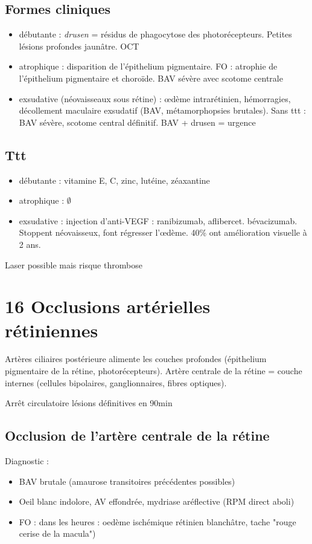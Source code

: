 \documentclass[11pt]{article}
\begin{document}
\subsection{Formes cliniques}
\label{sec:org13e641e}
\begin{itemize}
\item débutante : \emph{drusen} = résidus de phagocytose des photorécepteurs. Petites
lésions profondes jaunâtre. OCT
\item atrophique : disparition de l'épithelium pigmentaire. FO : atrophie de
l'épithelium pigmentaire et choroïde. BAV sévère avec scotome centrale
\item exsudative (néovaisseaux sous rétine) : \oe{}dème intrarétinien, hémorragies,
décollement maculaire exsudatif (BAV, métamorphopsies brutales). Sans ttt :
BAV sévère, scotome central définitif. BAV + drusen = urgence \skull
\end{itemize}

\subsection{Ttt}
\label{sec:org400e907}
\begin{itemize}
\item débutante : vitamine E, C, zinc, lutéine, zéaxantine
\item atrophique : \(\emptyset\)
\item exsudative : injection d'anti-VEGF : ranibizumab,
aflibercet. bévacizumab. Stoppent néovaisseux, font régresser l'\oe{}dème. 40\%
ont amélioration visuelle à 2 ans.
\end{itemize}
Laser possible mais risque thrombose
\section{16 Occlusions artérielles rétiniennes}
\label{sec:orgb973ac1}
Artères ciliaires postérieure alimente les couches profondes (épithelium
pigmentaire de la rétine, photorécepteurs). 
Artère centrale de la rétine = couche internes (cellules bipolaires,
ganglionnaires, fibres optiques).

Arrêt circulatoire \thus lésions définitives en 90min \danger

\subsection{Occlusion de l'artère centrale de la rétine}
\label{sec:org5e46735}
Diagnostic : 
\begin{itemize}
\item BAV brutale (amaurose transitoires précédentes possibles)
\item Oeil blanc indolore, AV effondrée, mydriase aréflective (RPM direct aboli)
\item FO : dans les heures : oedème ischémique rétinien blanchâtre, tache "rouge
cerise de la macula")
\end{itemize}
\end{document}
